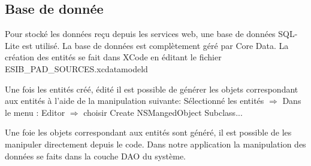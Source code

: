 	\subsection{Base de donnée} 
	Pour stocké les données reçu depuis les services web, une base de données SQL-Lite est utilisé. La base de données est complètement géré par \gls{Core Data}. 
	La création des entités se fait dans \gls{XCode} en éditant le fichier ESIB\_PAD\_SOURCES.xcdatamodeld 
	
	Une fois les entités créé, édité il est possible de générer les objets correspondant aux entités à l'aide de la manipulation suivante: Sélectionné les entités   \begin{math} \Rightarrow \end{math} Dans le menu : Editor  \begin{math} \Rightarrow \end{math}  choisir Create NSMangedObject Subclass... 
	
	Une foie les objets correspondant aux entités sont généré, il est possible de les manipuler directement depuis le code. Dans notre application la manipulation des données se faits dans la couche DAO du système.
	
\lstset{
	style = Xcode,
	caption=Exemple de création  lecture et suppression de donnés dans la base à l'aide de Core Data .,
	breaklines=true,
	frame=single
}

